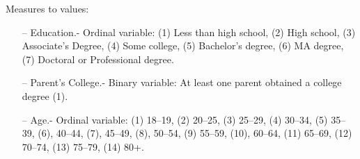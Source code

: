         Measures to values: \\
    \begin{itemize}
        \item[--] Education.- Ordinal variable: (1) Less than high school, (2) High school, (3) Associate's Degree, (4) Some college, (5) Bachelor's degree, (6) MA degree, (7) Doctoral or Professional degree.
        \item[--] Parent's College.- Binary variable: At least one parent obtained a college degree (1).
        \item[--] Age.- Ordinal variable: (1) 18--19, (2) 20--25, (3) 25--29, (4) 30--34, (5) 35--39, (6), 40--44, (7), 45--49, (8), 50--54, (9) 55--59, (10), 60--64, (11) 65--69, (12) 70--74, (13) 75--79, (14) 80+.
    \end{itemize}